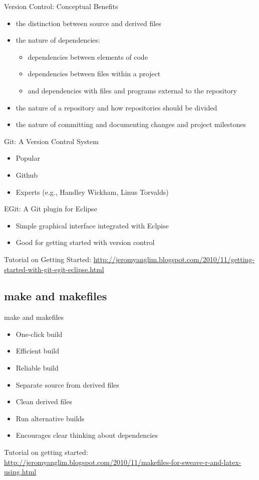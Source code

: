\begin{frame}{Version Control: Conceptual Benefits}
\begin{itemize}
  \item the distinction between source and derived files
  \item the nature of dependencies:
	\begin{itemize}
	\item dependencies between elements of code
	\item dependencies between files within a project
	\item and dependencies with files and programs external to the repository
	\end{itemize}
  \item the nature of a repository and how repositories should be divided
  \item the nature of committing and documenting changes and project milestones
\end{itemize}
\end{frame}

\begin{frame}{Git: A Version Control System}
\begin{itemize}
  \item Popular
  \item Github
  \item Experts (e.g., Handley Wickham, Linus Torvalds)
\end{itemize}
\end{frame}


\begin{frame}{EGit: A Git plugin for Eclipse}
\begin{itemize}
  \item Simple graphical interface integrated with Eclpise 
  \item Good for getting started with version control
\end{itemize}
{\tiny Tutorial on Getting Started: 
\url{http://jeromyanglim.blogspot.com/2010/11/getting-started-with-git-egit-eclipse.html}}
\end{frame}

\subsection{make and makefiles}
\begin{frame}{make and makefiles}
\begin{itemize}
  \item One-click build
  \item Efficient build
  \item Reliable build
  \item Separate source from derived files
  \item Clean derived files
  \item Run alternative builds
  \item Encourages clear thinking about dependencies
\end{itemize}

{\tiny Tutorial on getting started:
\url{http://jeromyanglim.blogspot.com/2010/11/makefiles-for-sweave-r-and-latex-using.html}}
\end{frame}

